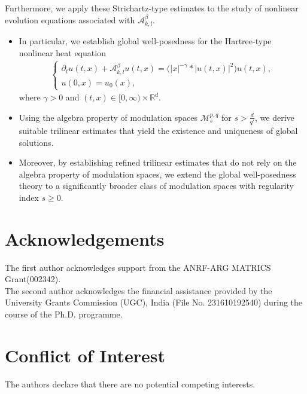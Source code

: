\documentclass[12pt,reqno,a4paper]{amsart}
\numberwithin{equation}{section}
\theoremstyle{plain}
\theoremstyle{definition}
\theoremstyle{remark}
\begin{document}
Furthermore, we apply these Strichartz-type estimates to the study of nonlinear evolution equations associated with $\mathcal{A}_{k,l}^{\beta}$.

\begin{itemize}
\item In particular, we establish global well-posedness for the Hartree-type nonlinear heat equation
\begin{align*}
\begin{cases}
\partial_{t}u(t,x)+\mathcal{A}_{k,l}^{\beta}u(t,x)
=
\bigl(|x|^{-\gamma}*|u(t,x)|^{2}\bigr)u(t,x),\\[1mm]
u(0,x)=u_{0}(x),
\end{cases}
\end{align*}
where $\gamma>0$ and $(t,x)\in [0,\infty)\times\mathbb{R}^{d}$.

\item Using the algebra property of modulation spaces
$\mathcal{M}^{p,q}_{s}$ for
$s>\frac{d}{q'}$,
we derive suitable trilinear estimates that yield the existence and uniqueness of global solutions.

\item Moreover, by establishing refined trilinear estimates that do not rely on the algebra property of modulation spaces, we extend the global well-posedness theory to a significantly broader class of modulation spaces with regularity index $s\geq 0$.
\end{itemize}

\section*{Acknowledgements} The first author acknowledges support from the ANRF-ARG MATRICS Grant(002342).\\ The second author acknowledges the financial assistance provided by the University Grants Commission (UGC), India (File No. 231610192540) during the course of the Ph.D. programme.
\section*{Conflict of Interest}
The authors declare that there are no potential competing interests.




\end{document}
